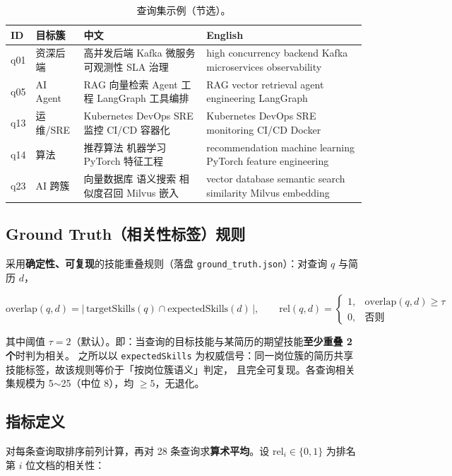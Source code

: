 \documentclass[11pt,a4paper,fontset=windows]{ctexart}
\begin{document}
\begin{table}[H]
\centering
\caption{查询集示例（节选）。}
\label{tab:queries}
\small
\begin{tabular}{llp{4.6cm}p{4.6cm}}
\toprule
ID & 目标簇 & 中文 & English \\
\midrule
q01 & 资深后端 & 高并发后端 Kafka 微服务 可观测性 SLA 治理 & high concurrency backend Kafka microservices observability \\
q05 & AI Agent & RAG 向量检索 Agent 工程 LangGraph 工具编排 & RAG vector retrieval agent engineering LangGraph \\
q13 & 运维/SRE & Kubernetes DevOps SRE 监控 CI/CD 容器化 & Kubernetes DevOps SRE monitoring CI/CD Docker \\
q14 & 算法 & 推荐算法 机器学习 PyTorch 特征工程 & recommendation machine learning PyTorch feature engineering \\
q23 & AI 跨簇 & 向量数据库 语义搜索 相似度召回 Milvus 嵌入 & vector database semantic search similarity Milvus embedding \\
\bottomrule
\end{tabular}
\end{table}

\subsection{Ground Truth（相关性标签）规则}
\label{sec:gt}
采用\textbf{确定性、可复现}的技能重叠规则（落盘 \texttt{ground\_truth.json}）：对查询 $q$ 与简历 $d$，

\[
\mathrm{overlap}(q,d) = \bigl|\, \mathrm{targetSkills}(q) \cap \mathrm{expectedSkills}(d) \,\bigr|,
\qquad
\mathrm{rel}(q,d) =
\begin{cases}
1, & \mathrm{overlap}(q,d) \ge \tau \\
0, & \text{否则}
\end{cases}
\]

其中阈值 $\tau=2$（默认）。即：当查询的目标技能与某简历的期望技能\textbf{至少重叠 2 个}时判为相关。
之所以以 \texttt{expectedSkills} 为权威信号：同一岗位簇的简历共享技能标签，故该规则等价于「按岗位簇语义」判定，
且完全可复现。各查询相关集规模为 5$\sim$25（中位 8），均 $\ge 5$，无退化。

\subsection{指标定义}
对每条查询取排序前列计算，再对 28 条查询求\textbf{算术平均}。设 $\mathrm{rel}_i\in\{0,1\}$ 为排名第 $i$ 位文档的相关性：
\end{document}
